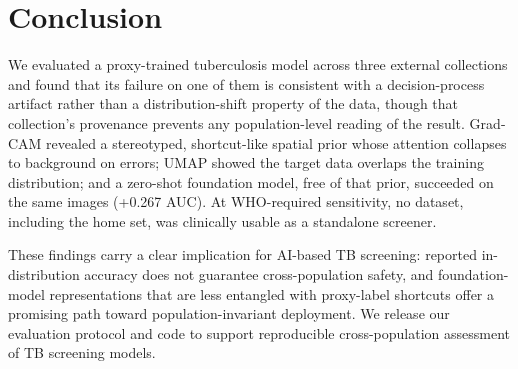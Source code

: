 \documentclass[runningheads]{llncs}
\begin{document}
\section{Conclusion}
We evaluated a proxy-trained tuberculosis model across three external collections and found that its failure on one of them is consistent with a decision-process artifact rather than a distribution-shift property of the data, though that collection's provenance prevents any population-level reading of the result. Grad-CAM revealed a stereotyped, shortcut-like spatial prior whose attention collapses to background on errors; UMAP showed the target data overlaps the training distribution; and a zero-shot foundation model, free of that prior, succeeded on the same images (+0.267 AUC). At WHO-required sensitivity, no dataset, including the home set, was clinically usable as a standalone screener.

These findings carry a clear implication for AI-based TB screening: reported in-distribution accuracy does not guarantee cross-population safety, and foundation-model representations that are less entangled with proxy-label shortcuts offer a promising path toward population-invariant deployment. We release our evaluation protocol and code to support reproducible cross-population assessment of TB screening models.
\end{document}
